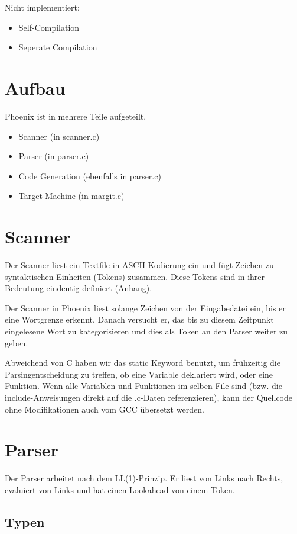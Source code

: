 \documentclass[a4paper,12pt]{article}
\begin{document}
	Nicht implementiert:
	\begin{itemize}
		\item Self-Compilation
		\item Seperate Compilation
	\end{itemize}

	\section{Aufbau}
	Phoenix ist in mehrere Teile aufgeteilt.
	\begin{itemize}
		\item Scanner (in scanner.c)
		\item Parser (in parser.c)
		\item Code Generation (ebenfalls in parser.c)
		\item Target Machine (in margit.c)
	\end{itemize}


	\section{Scanner}
	Der Scanner liest ein Textfile in ASCII-Kodierung ein und fügt Zeichen zu syntaktischen Einheiten (Tokens) zusammen.
	Diese Tokens sind in ihrer Bedeutung eindeutig definiert (Anhang).

	Der Scanner in Phoenix liest solange Zeichen von der Eingabedatei ein, bis er eine Wortgrenze erkennt.
	Danach versucht er, das bis zu diesem Zeitpunkt eingelesene Wort zu kategorisieren und dies als Token an den Parser weiter zu geben.

	Abweichend von C haben wir das static Keyword benutzt, um frühzeitig die Parsingentscheidung zu treffen, ob eine Variable deklariert wird, oder eine Funktion.
	Wenn alle Variablen und Funktionen im selben File sind (bzw. die include-Anweisungen direkt auf die .c-Daten referenzieren), kann der Quellcode ohne Modifikationen auch vom GCC übersetzt werden.

	\section{Parser}
	Der Parser arbeitet nach dem LL(1)-Prinzip. Er liest von Links nach Rechts, evaluiert von Links und hat einen Lookahead von einem Token.

	\subsection{Typen}
\end{document}
